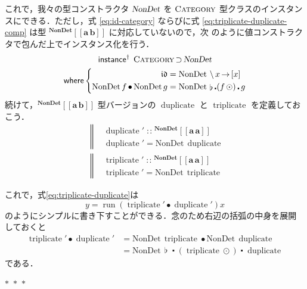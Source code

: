 \documentclass[a5paper,twoside,fleqn,draft]{jsbook}
\def\[{[\![}
\def\]{]\!]}
\newcommand{\separator}{\begin{center}$*$~$*$~$*$\end{center}}
\newcommand{\mBrace}{\Vert}
\newcommand{\mKeyword}[1]{\mathsf{#1}}
\newcommand{\mInstanceDeclKeyword}{\mKeyword{instance}}
\newcommand{\mWhereKeyword}{\mKeyword{where}}
\DeclareMathOperator{\mInstanceDeclPolymorphic}{\mInstanceDeclKeyword^{\dagger}}
\DeclareMathOperator{\mSuperSet}{\supset}
\DeclareMathOperator{\mWhere}{\mWhereKeyword}
\newcommand{\mSpecialFunc}[1]{#1}
\newcommand{\mVarSpecialFunc}[1]{\mathfrak{#1}}
\DeclareMathOperator{\mDuplicate}{\mSpecialFunc{duplicate}}
\DeclareMathOperator{\mIdCat}{\mVarSpecialFunc{id}}
\DeclareMathOperator{\mRun}{\mSpecialFunc{run}}
\DeclareMathOperator{\mTriplicate}{\mSpecialFunc{triplicate}}
\DeclareMathOperator{\mComp}{\centerdot}
\DeclareMathOperator{\mCompCat}{\bullet}
\DeclareMathOperator{\mIn}{{:\!:}}
\DeclareMathOperator{\mJoinList}{\flat} %
\DeclareMathOperator{\mLambda}{\backslash}
\DeclareMathOperator{\mLambdaArrow}{\rightarrow}
\DeclareMathOperator{\mMapList}{\odot}
\newcommand{\mType}[1]{\mathbf{#1}} %
\newcommand{\mA}{\mType{a}}
\newcommand{\mB}{\mType{b}}
\newcommand{\mTypeAssemble}[2]{{}^\mType{#1}\[\mType{#2}\]}
\newcommand{\mTypeConstructor}[1]{\textsl{#1}}
\newcommand{\mValueConstructor}[1]{\mathrm{#1}}
\newcommand{\mValueWith}[2]{\mValueConstructor{#1}\,#2}
\newcommand{\mTypeClass}[1]{\textsc{#1}} %
\newcommand{\mCategoryTypeClass}{\mTypeClass{Category}}
\newcommand{\mLambdaEXP}[2]{\mLambda{#1}\mLambdaArrow{#2}} %
\begin{document}
これで，我々の型コンストラクタ $\mTypeConstructor{NonDet}$ を
$\mCategoryTypeClass$ 型クラスのインスタンスにできる．ただし，式
\eqref{eq:id-category} ならびに式 \eqref{eq:triplicate-duplicate-comp}
は型 $\mTypeAssemble{NonDet}{\mA\,\mB}$ に対応していないので，次
のように値コンストラクタで包んだ上でインスタンス化を行う．
\begin{multline}
  \label{eq:nondet-instance}
  \mInstanceDeclPolymorphic\;
  \mTypeClass{Category}\mSuperSet\mTypeConstructor{NonDet}\\
  \mWhere\left\{
  \begin{aligned}
    \mIdCat
    &=\mValueWith{NonDet}{\mLambdaEXP{x}{[x]}}\\
    \mValueWith{NonDet}{f}\mCompCat\mValueWith{NonDet}{g}
    &=\mValueWith{NonDet}{\mJoinList\mComp(f\mMapList)\mComp g}
  \end{aligned}
  \right.
\end{multline}
続けて，$\mTypeAssemble{NonDet}{\mA\,\mB}$ 型バージョンの
$\mDuplicate$ と $\mTriplicate$ を定義しておこう．
\begin{align}
  &\left\mBrace
  \begin{aligned}
    &\mDuplicate'
    \mIn\mTypeAssemble{NonDet}{\mA\,\mA}\\
    &\mDuplicate'
    =\mValueWith{NonDet}{\mDuplicate}
  \end{aligned}
  \right.\\
  &\left\mBrace
  \begin{aligned}
    &\mTriplicate'
    \mIn\mTypeAssemble{NonDet}{\mA\,\mA}\\
    &\mTriplicate'
    =\mValueWith{NonDet}{\mTriplicate}
  \end{aligned}
  \right.
\end{align}

これで，式\eqref{eq:triplicate-duplicate}は
\begin{equation}
  y=\mRun(\mTriplicate'\mCompCat\mDuplicate')x
\end{equation}
のようにシンプルに書き下すことができる．念のため右辺の括弧の中身を展開
しておくと
\begin{align}
  \mTriplicate'\mCompCat\mDuplicate'
  &=\mValueWith{NonDet}{\mTriplicate}\mCompCat\mValueWith{NonDet}{\mDuplicate}\\
  &=\mValueWith{NonDet}{\mJoinList\mComp(\mTriplicate\mMapList)\mComp\mDuplicate}
\end{align}
である．

\separator
\end{document}
